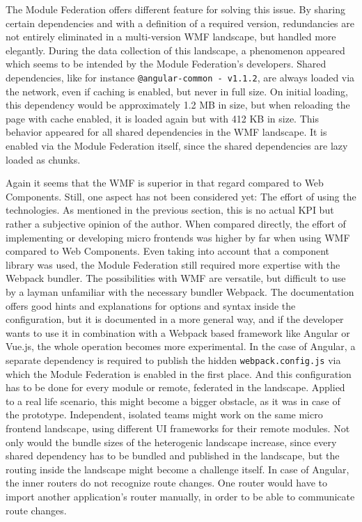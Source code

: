 The Module Federation offers different feature for solving this issue. 
By sharing certain dependencies and with a definition of a required version, redundancies are not entirely eliminated in a multi-version WMF landscape, but handled more elegantly. 
During the data collection of this landscape, a phenomenon appeared which seems to be intended by the Module Federation's developers. 
Shared dependencies, like for instance \texttt{@angular-common - v1.1.2}, are always loaded via the network, even if caching is enabled, but never in full size. 
On initial loading, this dependency would be approximately 1.2 MB in size, but when reloading the page with cache enabled, it is loaded again but with 412 KB in size.
This behavior appeared for all shared dependencies in the WMF landscape. It is enabled via the Module Federation itself, since the shared dependencies are lazy loaded as chunks.\cite{wmf_the_good_and_ugly}

Again it seems that the WMF is superior in that regard compared to Web Components. 
Still, one aspect has not been considered yet: The effort of using the technologies. 
As mentioned in the previous section, this is no actual KPI but rather a subjective opinion of the author. 
When compared directly, the effort of implementing or developing micro frontends was higher by far when using WMF compared to Web Components. 
Even taking into account that a component library was used, the Module Federation still required more expertise with the Webpack bundler.
The possibilities with WMF are versatile, but difficult to use by a layman unfamiliar with the necessary bundler Webpack. 
The documentation offers good hints and explanations for options and syntax inside the configuration, but it is documented in a more general way, and if the developer wants to use it in combination with a Webpack based framework like Angular or Vue.js, the whole operation becomes more experimental. 
In the case of Angular, a separate dependency is required to publish the hidden \texttt{webpack.config.js} via which the Module Federation is enabled in the first place. 
And this configuration has to be done for every module or remote, federated in the landscape. 
Applied to a real life scenario, this might become a bigger obstacle, as it was in case of the prototype.
Independent, isolated teams might work on the same micro frontend landscape, using different UI frameworks for their remote modules. 
Not only would the bundle sizes of the heterogenic landscape increase, since every shared dependency has to be bundled and published in the landscape, but the routing inside the landscape might become a challenge itself. 
In case of Angular, the inner routers do not recognize route changes. One router would have to import another application's router manually, in order to be able to communicate route changes.\cite{wmf_the_good_and_ugly}

